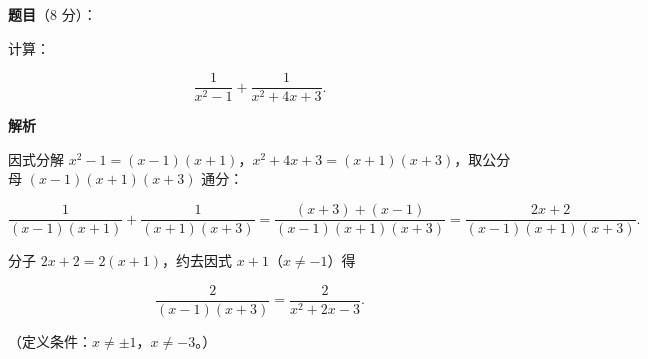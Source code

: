 \begin{answer}

\textbf{题目}（8 分）：

计算：

\nopagebreak[4]
\[
\frac{1}{x^2-1}+\frac{1}{x^2+4x+3}.
\]

\textbf{解析}

因式分解 $x^2-1=(x-1)(x+1)$，$x^2+4x+3=(x+1)(x+3)$，取公分母 $(x-1)(x+1)(x+3)$ 通分：

\nopagebreak[4]
\[
\frac{1}{(x-1)(x+1)}+\frac{1}{(x+1)(x+3)}
=\frac{(x+3)+(x-1)}{(x-1)(x+1)(x+3)}
=\frac{2x+2}{(x-1)(x+1)(x+3)}.
\]

分子 $2x+2=2(x+1)$，约去因式 $x+1$（$x\ne-1$）得

\nopagebreak[4]
\[
\frac{2}{(x-1)(x+3)}=\frac{2}{x^2+2x-3}.
\]

（定义条件：$x\ne\pm1$，$x\ne-3$。）


\end{answer}
